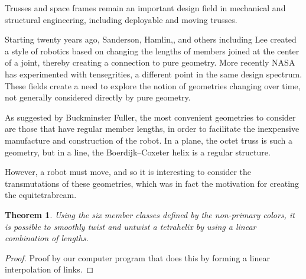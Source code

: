 \documentclass[11pt]{article}
\newtheorem{theorem}{Theorem}
\begin{document}
Trusses and space frames remain an important design field in mechanical and structural engineering\cite{mikulas1985sequentially},
including deployable and moving trusses\cite{claypool2012readily}.

Starting twenty years ago, Sanderson\cite{sanderson1996modular}, Hamlin,\cite{TetrobotBook}, and others including Lee\cite{lee2002dynamic}
created a style of robotics based on changing the lengths of members
joined at the center of a joint, thereby creating a connection to pure geometry. More recently NASA has experimented with
tensegrities\cite{NTRT}, a different point in the same design spectrum. These fields create a need to explore the notion of
geometries changing over time, not generally considered directly by pure geometry.

As suggested by Buckminster Fuller, the most convenient geometries to consider are those that have regular member
lengths, in order to facilitate the inexpensive manufacture and construction of the robot.  In a plane, the octet truss
is such a geometry, but in a line, the Boerdijk--Coxeter helix is a regular structure.

However, a robot must move, and so it is interesting to consider the transmutations of these geometries, which was in
fact the motivation for creating the equitetrabream.

\begin{theorem}

  Using the six member classes defined by the non-primary colors, it is possible to smoothly twist and untwist a tetrahelix by
  using a linear combination of lengths.
  
\end{theorem}

\begin{proof}
  Proof by our computer program that does this by forming a linear interpolation of links.
\end{proof}
\end{document}
